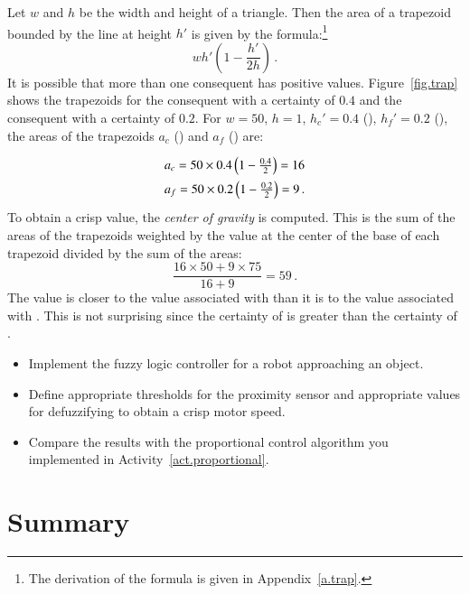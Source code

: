 Let $w$ and $h$ be the width and height of a triangle. Then the area of a trapezoid bounded by the line at height $h'$ is given by the formula:\footnote{The derivation of the formula is given in Appendix~\ref{a.trap}.}
\begin{displaymath}
wh'\left(1-\frac{h'}{2h}\right)\,.
\end{displaymath}
It is possible that more than one consequent has positive values. Figure~\ref{fig.trap} shows the trapezoids for the consequent  with a certainty of $0.4$ and the consequent  with a certainty of $0.2$. For $w=50$, $h=1$, $h_{c}'=0.4$ (), $h_{f}'=0.2$ (), the areas of the trapezoids $a_c$ () and $a_f$ () are:
\begin{displaymath}
\spacearray
\begin{array}{l}
a_c = 50\times 0.4 \left(1 - \frac{0.4}{2}\right) = 16\\
a_f = 50\times 0.2 \left(1 - \frac{0.2}{2}\right) = 9\,.
\end{array}
\end{displaymath}
To obtain a crisp value, the \emph{center of gravity} is computed. This is the sum of the areas of the trapezoids weighted by the value at the center of the base of each trapezoid divided by the sum of the areas:
\begin{displaymath}
\frac{16\times 50 + 9\times 75}{16+9}=59\,.
\end{displaymath}
The value is closer to the value associated with  than it is to the value associated with . This is not surprising since the certainty of  is greater than the certainty of .

\begin{framed}
\begin{itemize}
\item Implement the fuzzy logic controller for a robot approaching an object.
\item Define appropriate thresholds for the proximity sensor and appropriate values for defuzzifying to obtain a crisp motor speed.
\item Compare the results with the proportional control algorithm you implemented in Activity~\ref{act.proportional}.
\end{itemize}
\end{framed}

\section{Summary}

